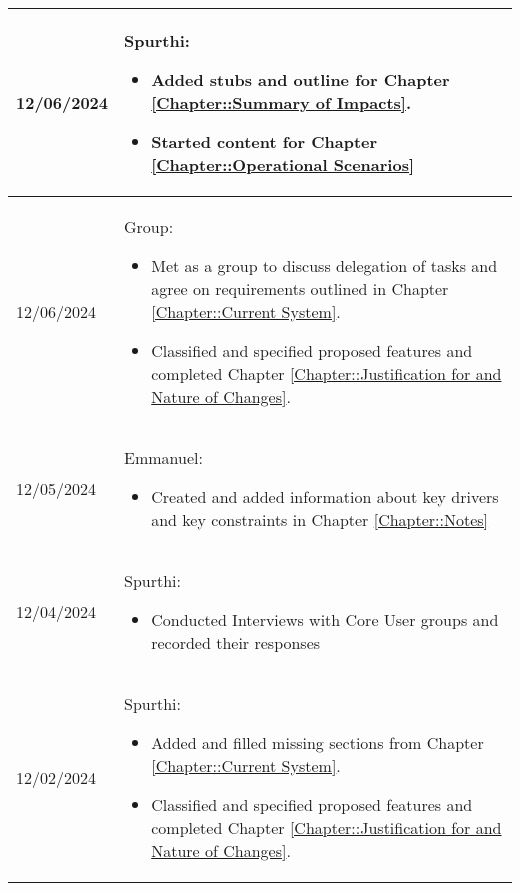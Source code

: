\begin{longtable}{|l||p{13.5cm}|}
12/06/2024 & Spurthi:
\begin{itemize}[topsep=0pt,itemsep=0pt,parsep=0pt,partopsep=0pt,leftmargin=12pt]
    \item Added stubs and outline for Chapter \ref{Chapter::Summary of Impacts}.
    \item Started content for Chapter \ref{Chapter::Operational Scenarios}
\end{itemize} 
\\ \hline

12/06/2024 & Group:
\begin{itemize}[topsep=0pt,itemsep=0pt,parsep=0pt,partopsep=0pt,leftmargin=12pt]
    \item Met as a group to discuss delegation of tasks and agree on requirements outlined in Chapter \ref{Chapter::Current System}.
    \item Classified and specified proposed features and completed Chapter \ref{Chapter::Justification for and Nature of Changes}.
\end{itemize} 
\\ \hline

12/05/2024 & Emmanuel:
\begin{itemize}[topsep=0pt,itemsep=0pt,parsep=0pt,partopsep=0pt,leftmargin=12pt]
    \item Created and added information about key drivers and key constraints in Chapter \ref{Chapter::Notes}
    \
\end{itemize} 
\\ \hline

12/04/2024 & Spurthi:
\begin{itemize}[topsep=0pt,itemsep=0pt,parsep=0pt,partopsep=0pt,leftmargin=12pt]
    \item Conducted Interviews with Core User groups and recorded their responses 
    \
\end{itemize} 
\\ \hline




12/02/2024 & Spurthi:
\begin{itemize}[topsep=0pt,itemsep=0pt,parsep=0pt,partopsep=0pt,leftmargin=12pt]
    \item Added and filled missing sections from Chapter \ref{Chapter::Current System}.
    \item Classified and specified proposed features and completed Chapter \ref{Chapter::Justification for and Nature of Changes}.
\end{itemize} 
\\ \hline


\end{longtable}
